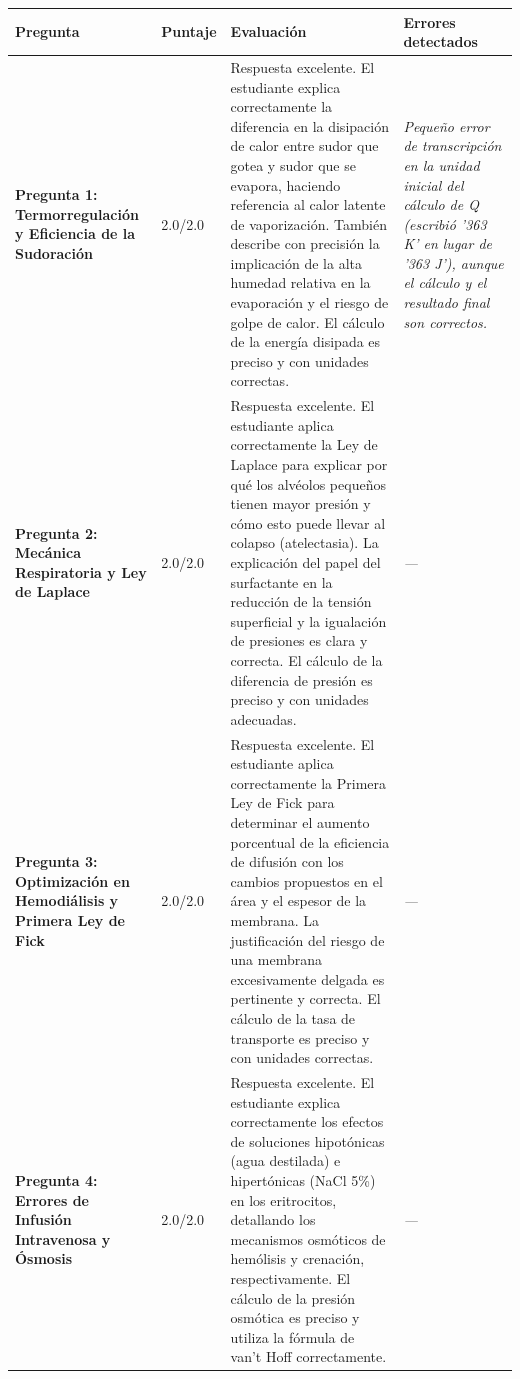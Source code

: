 \documentclass[11pt,a4paper]{article}
\begin{document}
\begin{longtable}{>{\bfseries}p{2.8cm} p{1.6cm} p{7.0cm} p{2.8cm}}
  \toprule
  \textbf{Pregunta} & \textbf{Puntaje} & \textbf{Evaluación} & \textbf{Errores detectados} \\
  \midrule
  \endhead
  \bottomrule
  \endfoot
    \textbf{Pregunta 1: Termorregulación y Eficiencia de la Sudoración} & 2.0/2.0 & Respuesta excelente. El estudiante explica correctamente la diferencia en la disipación de calor entre sudor que gotea y sudor que se evapora, haciendo referencia al calor latente de vaporización. También describe con precisión la implicación de la alta humedad relativa en la evaporación y el riesgo de golpe de calor. El cálculo de la energía disipada es preciso y con unidades correctas. & \textit{Pequeño error de transcripción en la unidad inicial del cálculo de Q (escribió '363 K' en lugar de '363 J'), aunque el cálculo y el resultado final son correctos.} \\
    \midrule
    \textbf{Pregunta 2: Mecánica Respiratoria y Ley de Laplace} & 2.0/2.0 & Respuesta excelente. El estudiante aplica correctamente la Ley de Laplace para explicar por qué los alvéolos pequeños tienen mayor presión y cómo esto puede llevar al colapso (atelectasia). La explicación del papel del surfactante en la reducción de la tensión superficial y la igualación de presiones es clara y correcta. El cálculo de la diferencia de presión es preciso y con unidades adecuadas. & \textit{---} \\
    \midrule
    \textbf{Pregunta 3: Optimización en Hemodiálisis y Primera Ley de Fick} & 2.0/2.0 & Respuesta excelente. El estudiante aplica correctamente la Primera Ley de Fick para determinar el aumento porcentual de la eficiencia de difusión con los cambios propuestos en el área y el espesor de la membrana. La justificación del riesgo de una membrana excesivamente delgada es pertinente y correcta. El cálculo de la tasa de transporte es preciso y con unidades correctas. & \textit{---} \\
    \midrule
    \textbf{Pregunta 4: Errores de Infusión Intravenosa y Ósmosis} & 2.0/2.0 & Respuesta excelente. El estudiante explica correctamente los efectos de soluciones hipotónicas (agua destilada) e hipertónicas (NaCl 5\%) en los eritrocitos, detallando los mecanismos osmóticos de hemólisis y crenación, respectivamente. El cálculo de la presión osmótica es preciso y utiliza la fórmula de van't Hoff correctamente. & \textit{---} \\
    \midrule

\end{longtable}
\end{document}
